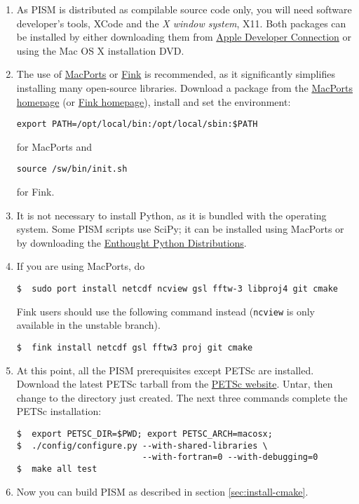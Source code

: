 \documentclass[titlepage,letterpaper,final]{scrartcl}
\begin{document}
\begin{enumerate}
\item As PISM is distributed as compilable source code only, you will need
  software developer's tools, XCode and the \emph{X window system}, X11. Both
  packages can be installed by either downloading them from
  \href{http://developer.apple.com/tools/xcode/}{Apple Developer Connection} or
  using the Mac OS X installation DVD.
\item The use of \href{http://www.macports.org/}{MacPorts} or
  \href{http://www.finkproject.org/}{Fink} is recommended, as it significantly
  simplifies installing many open-source libraries. Download a package from the
  \href{http://www.macports.org/install.php}{MacPorts homepage} (or
  \href{http://www.finkproject.org/download/index.php}{Fink homepage}), install
  and set the environment:

\begin{verbatim}
export PATH=/opt/local/bin:/opt/local/sbin:$PATH
\end{verbatim}
for MacPorts and
\begin{verbatim}
source /sw/bin/init.sh
\end{verbatim}
for Fink.

\item It is not necessary to install Python, as it is bundled with
  the operating system. Some PISM scripts use SciPy; it can be installed using MacPorts or
  by downloading the \href{http://www.enthought.com/}{Enthought Python Distributions}.

\item  If you are using MacPorts, do
\begin{verbatim}
$  sudo port install netcdf ncview gsl fftw-3 libproj4 git cmake
\end{verbatim}

Fink users should use the following command instead (\texttt{ncview} is only available in the unstable branch).
\begin{verbatim}
$  fink install netcdf gsl fftw3 proj git cmake
\end{verbatim}

\item At this point, all the PISM prerequisites except PETSc are installed.
Download the latest PETSc tarball from the
  \href{http://www.mcs.anl.gov/petsc/petsc-as/}{PETSc website}.
Untar, then change to the directory just created.
The next three commands complete the PETSc installation:
\begin{verbatim}
$  export PETSC_DIR=$PWD; export PETSC_ARCH=macosx;
$  ./config/configure.py --with-shared-libraries \
                         --with-fortran=0 --with-debugging=0
$  make all test
\end{verbatim}

\item Now you can build PISM as described in section \ref{sec:install-cmake}.
\end{enumerate}
\end{document}
